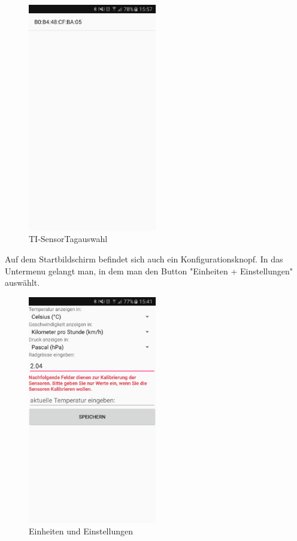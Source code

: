\begin{figure}[ht]
    \includegraphics[width=0.5\textwidth]{4Resultate/imag/BLEAdresseAuswaehlen.png} 
    \caption{TI-SensorTagauswahl}
    \label{sensorauswahl}
\end{figure}

Auf dem Startbildschirm befindet sich auch ein Konfigurationsknopf. In das Untermenu gelangt man, in dem man den Button "Einheiten + Einstellungen" auswählt.

\begin{figure}[ht]
    \includegraphics[width=0.5\textwidth]{4Resultate/imag/BLEEinheitenUndEinstellungenStart.png} 
    \caption{Einheiten und Einstellungen}
    \label{einheiten}
\end{figure}


